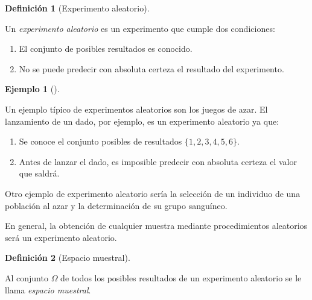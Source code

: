\documentclass[
  a4paper,
]{scrreport}
\providecommand{\tightlist}{%
  \setlength{\itemsep}{0pt}\setlength{\parskip}{0pt}}\usepackage{longtable,booktabs,array}
\theoremstyle{plain}
\theoremstyle{definition}
\newtheorem{definition}{Definición}[chapter]
\theoremstyle{definition}
\newtheorem{example}{Ejemplo}[chapter]
\theoremstyle{remark}
\begin{document}
\begin{definition}[Experimento
aleatorio]\protect\hypertarget{def-experimento-aleatorio}{}\label{def-experimento-aleatorio}

Un \emph{experimento aleatorio} es un experimento que cumple dos
condiciones:

\begin{enumerate}
\def\labelenumi{\arabic{enumi}.}
\tightlist
\item
  El conjunto de posibles resultados es conocido.
\item
  No se puede predecir con absoluta certeza el resultado del
  experimento.
\end{enumerate}

\end{definition}

\begin{example}[]\protect\hypertarget{exm-experimento-aleatorio}{}\label{exm-experimento-aleatorio}

Un ejemplo típico de experimentos aleatorios son los juegos de azar. El
lanzamiento de un dado, por ejemplo, es un experimento aleatorio ya que:

\begin{enumerate}
\def\labelenumi{\arabic{enumi}.}
\tightlist
\item
  Se conoce el conjunto posibles de resultados \(\{1,2,3,4,5,6\}\).
\item
  Antes de lanzar el dado, es imposible predecir con absoluta certeza el
  valor que saldrá.
\end{enumerate}

Otro ejemplo de experimento aleatorio sería la selección de un individuo
de una población al azar y la determinación de su grupo sanguíneo.

En general, la obtención de cualquier muestra mediante procedimientos
aleatorios será un experimento aleatorio.

\end{example}

\begin{definition}[Espacio
muestral]\protect\hypertarget{def-espacio-muestral}{}\label{def-espacio-muestral}

Al conjunto \(\Omega\) de todos los posibles resultados de un
experimento aleatorio se le llama \emph{espacio muestral}.

\end{definition}
\end{document}
